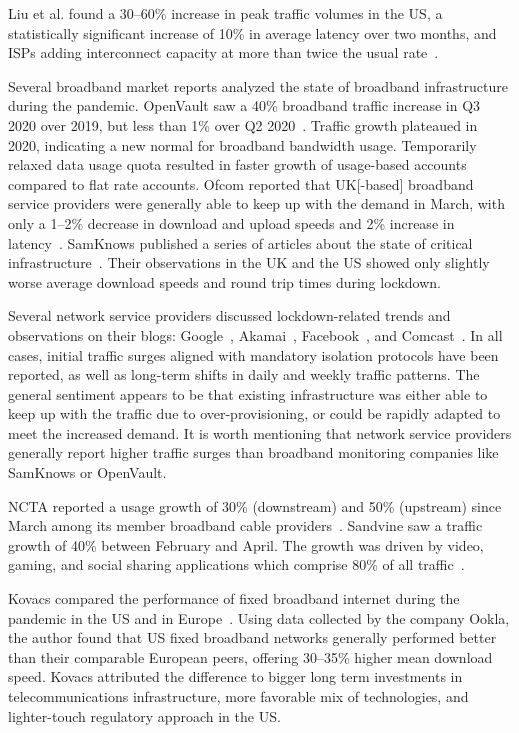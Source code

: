 \documentclass[conference,10pt]{IEEEtran}
\begin{document}
Liu et al. found a 30--60\% increase in peak traffic volumes in the \gls{US}, a statistically significant increase of 10\% in average latency over two months, and \glspl{ISP} adding interconnect capacity at more than twice the usual rate~\cite{liu2020characterizing}.

Several broadband market reports analyzed the state of broadband infrastructure during the pandemic. OpenVault saw a 40\% broadband traffic increase in Q3 2020 over 2019, but less than 1\% over Q2 2020~\cite{openvault}. Traffic growth plateaued in 2020, indicating a new normal for broadband bandwidth usage. Temporarily relaxed data usage quota resulted in faster growth of usage-based accounts compared to flat rate accounts. Ofcom reported that \gls{UK}[-based] broadband service providers were generally able to keep up with the demand in March, with only a 1--2\% decrease in download and upload speeds and 2\% increase in latency~\cite{uk-home-broadband-performance}. SamKnows published a series of articles about the state of critical infrastructure~\cite{samknows-cdn,samknows-video-streaming,samknows-video-conferencing,samknows-usa}. Their observations in the \gls{UK} and the \gls{US} showed only slightly worse average download speeds and round trip times during lockdown.

Several network service providers discussed lockdown-related trends and observations on their blogs: Google~\cite{google}, Akamai~\cite{akamai}, Facebook~\cite{facebook}, and Comcast~\cite{comcast}. In all cases, initial traffic surges aligned with mandatory isolation protocols have been reported, as well as long-term shifts in daily and weekly traffic patterns. The general sentiment appears to be that existing infrastructure was either able to keep up with the traffic due to over-provisioning, or could be rapidly adapted to meet the increased demand. It is worth mentioning that network service providers generally report higher traffic surges than broadband monitoring companies like SamKnows or OpenVault.

NCTA reported a usage growth of 30\% (downstream) and 50\% (upstream) since March among its member broadband cable providers~\cite{ncta}. Sandvine saw a traffic growth of 40\% between February and April. The growth was driven by video, gaming, and social sharing applications which comprise 80\% of all traffic~\cite{sandvine}.

Kovacs compared the performance of fixed broadband internet during the pandemic in the \gls{US} and in Europe~\cite{kovacs}. Using data collected by the company Ookla, the author found that \gls{US} fixed broadband networks generally performed better than their comparable European peers, offering 30--35\% higher mean download speed. Kovacs attributed the difference to bigger long term investments in telecommunications infrastructure, more favorable mix of technologies, and lighter-touch regulatory approach in the \gls{US}.
\end{document}
